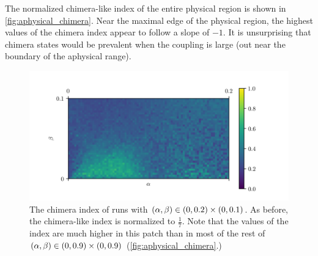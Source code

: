 The normalized chimera-like index of the entire physical region is shown in \cref{fig:aphysical_chimera}.
Near the maximal edge of the physical region, the highest values of the chimera index appear to follow a slope of $-1$.
It is unsurprising that chimera states would be prevalent when the coupling is large (out near the boundary of the aphysical range).
\begin{figure}[ht]
  \centering
  \includegraphics{figure/zoom_chimera}
  \caption[Zoomed landscape]{The chimera index of runs with $(\alpha, \beta) \in (0, 0.2) \times (0, 0.1)$.
    As before, the chimera-like index is normalized to $\frac{1}{7}$.
    Note that the values of the index are much higher in this patch than in most of the rest of $(\alpha, \beta) \in (0, 0.9) \times (0, 0.9)$ (\cref{fig:aphysical_chimera}.)
  }
  \label{fig:zoom_chimera}
\end{figure}

